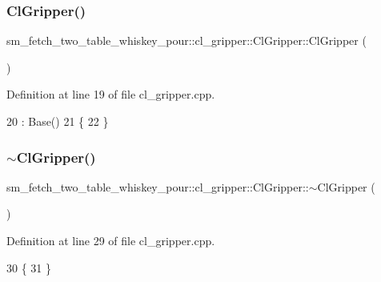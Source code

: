 \subsubsection{\texorpdfstring{Cl\+Gripper()}{ClGripper()}\hspace{0.1cm}{\footnotesize\ttfamily [2/2]}}
{\footnotesize\ttfamily sm\+\_\+fetch\+\_\+two\+\_\+table\+\_\+whiskey\+\_\+pour\+::cl\+\_\+gripper\+::\+Cl\+Gripper\+::\+Cl\+Gripper (\begin{DoxyParamCaption}{ }\end{DoxyParamCaption})}



Definition at line 19 of file cl\+\_\+gripper.\+cpp.


\begin{DoxyCode}
20     : Base()
21 \{
22 \}
\end{DoxyCode}
\mbox{\label{classsm__fetch__two__table__whiskey__pour_1_1cl__gripper_1_1ClGripper_ab46766167ae2d366f7f83d5cf34f68f4}} 
\subsubsection{\texorpdfstring{$\sim$\+Cl\+Gripper()}{~ClGripper()}}
{\footnotesize\ttfamily sm\+\_\+fetch\+\_\+two\+\_\+table\+\_\+whiskey\+\_\+pour\+::cl\+\_\+gripper\+::\+Cl\+Gripper\+::$\sim$\+Cl\+Gripper (\begin{DoxyParamCaption}{ }\end{DoxyParamCaption})\hspace{0.3cm}{\ttfamily [virtual]}}



Definition at line 29 of file cl\+\_\+gripper.\+cpp.


\begin{DoxyCode}
30 \{
31 \}
\end{DoxyCode}


